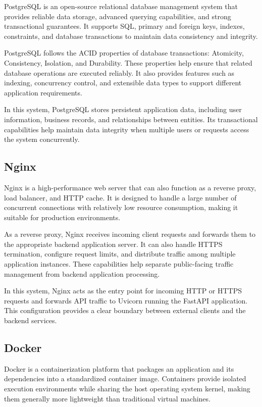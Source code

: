 PostgreSQL is an open-source relational database management system
that provides reliable data storage, advanced querying capabilities,
and strong transactional guarantees. It supports SQL, primary and
foreign keys, indexes, constraints, and database transactions to
maintain data consistency and integrity.

PostgreSQL follows the ACID properties of database transactions:
Atomicity, Consistency, Isolation, and Durability. These properties
help ensure that related database operations are executed reliably.
It also provides features such as indexing, concurrency control,
and extensible data types to support different application requirements.

In this system, PostgreSQL stores persistent application data,
including user information, business records, and relationships
between entities. Its transactional capabilities help maintain
data integrity when multiple users or requests access the system
concurrently.

\subsection{Nginx}

Nginx is a high-performance web server that can also function as
a reverse proxy, load balancer, and HTTP cache. It is designed to
handle a large number of concurrent connections with relatively
low resource consumption, making it suitable for production
environments.

As a reverse proxy, Nginx receives incoming client requests and
forwards them to the appropriate backend application server.
It can also handle HTTPS termination, configure request limits,
and distribute traffic among multiple application instances.
These capabilities help separate public-facing traffic management
from backend application processing.

In this system, Nginx acts as the entry point for incoming HTTP
or HTTPS requests and forwards API traffic to Uvicorn running
the FastAPI application. This configuration provides a clear
boundary between external clients and the backend services.

\subsection{Docker}

Docker is a containerization platform that packages an application
and its dependencies into a standardized container image. Containers
provide isolated execution environments while sharing the host
operating system kernel, making them generally more lightweight
than traditional virtual machines.

